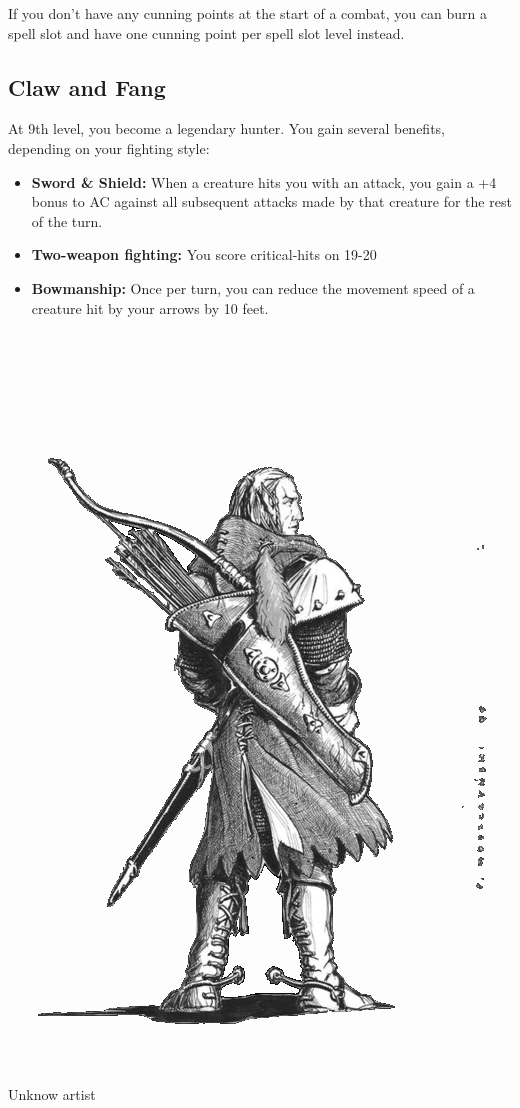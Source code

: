 \begin{multicols*}{2}
If you don't have any cunning points at the start of a combat, you can burn a spell slot and have one cunning point per spell slot level instead.

\subsection*{Claw and Fang}

At 9th level, you become a legendary hunter. You gain several benefits, depending on your fighting style:

\begin{itemize}
    \item \textbf{Sword \& Shield:} When a creature hits you with an attack, you gain a +4 bonus to AC against all subsequent attacks made by that creature for the rest of the turn.
    \item \textbf{Two-weapon fighting:} You score critical-hits on 19-20
    \item \textbf{Bowmanship:} Once per turn, you can reduce the movement speed of a creature hit by your arrows by 10 feet.
\end{itemize}

\begin{Figure}
\centering
\includegraphics[width=\textwidth]{img/longbow.png}
{\scriptsize Unknow artist}
\end{Figure}
    
\end{multicols*}


